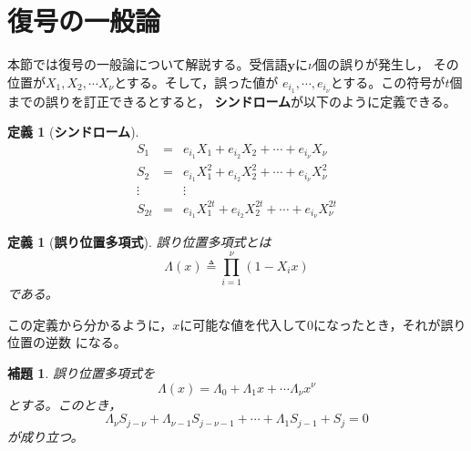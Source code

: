 \documentclass[12pt]{jarticle}
\theoremstyle{break}
\newtheorem{lemma}[theorem]{補題}
\newtheorem{definition}[theorem]{定義}
\def\itLambda{\mathit{\Lambda}}
\def\itLambda{\mathit{\Lambda}}
\begin{document}
\section{復号の一般論}
本節では復号の一般論について解説する。受信語$\bm{y}$に$\nu$個の誤りが発生し，
その位置が$X_{1},X_{2},\cdots X_{\nu}$とする。そして，誤った値が
$e_{i_{1}},\cdots,e_{i_{\nu}}$とする。この符号が$t$個までの誤りを訂正できるとすると，
{\bf シンドローム}が以下のように定義できる。
\begin{framed}
\begin{definition}[{\bf シンドローム}]
\begin{eqnarray}
S_{1}&=&e_{i_{1}}X_{1}+e_{i_{2}}X_{2}+\cdots+e_{i_{\nu}}X_{\nu}\nonumber\\
S_{2}&=&e_{i_{1}}X_{1}^{2}+e_{i_{2}}X_{2}^{2}+\cdots+e_{i_{\nu}}X_{\nu}^{2}\nonumber\\
\vdots&&\vdots\nonumber\\
S_{2t}&=&e_{i_{1}}X_{1}^{2t}+e_{i_{2}}X_{2}^{2t}+\cdots+e_{i_{\nu}}X_{\nu}^{2t}\nonumber
\end{eqnarray}
\end{definition}
\end{framed}
\begin{framed}
\begin{definition}[{\bf 誤り位置多項式}]
誤り位置多項式とは
\begin{equation}
\itLambda(x)\triangleq\prod_{i=1}^{\nu}(1-X_{i}x)\label{eq:error_locator}
\end{equation}
である。
\end{definition}
\end{framed}
この定義から分かるように，$x$に可能な値を代入して$0$になったとき，それが誤り位置の逆数
になる。
\begin{framed}
\begin{lemma}
誤り位置多項式を
\begin{equation}
\itLambda(x)=\itLambda_{0}+\itLambda_{1}x+\cdots\itLambda_{\nu}x^{\nu}
\nonumber
\end{equation}
とする。このとき，
\begin{equation}
\itLambda_{\nu}S_{j-\nu}+\itLambda_{\nu-1}S_{j-\nu-1}+\cdots+
\itLambda_{1}S_{j-1}+S_{j}=0\nonumber
\end{equation}
が成り立つ。
\end{lemma}
\end{framed}
\end{document}
